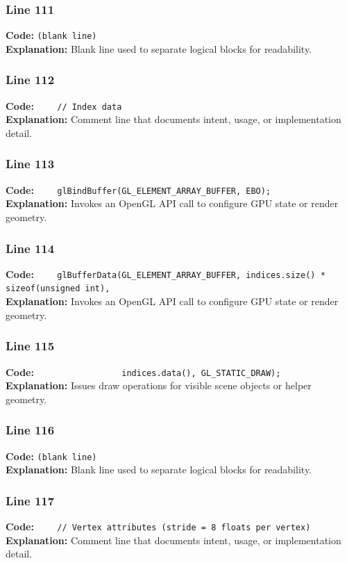 \documentclass[11pt,a4paper]{article}
\begin{document}
\subsubsection*{Line 111}
\textbf{Code:} \texttt{(blank line)}\\
\textbf{Explanation:} Blank line used to separate logical blocks for readability.

\subsubsection*{Line 112}
\textbf{Code:} \verb|    // Index data|\\
\textbf{Explanation:} Comment line that documents intent, usage, or implementation detail.

\subsubsection*{Line 113}
\textbf{Code:} \verb|    glBindBuffer(GL_ELEMENT_ARRAY_BUFFER, EBO);|\\
\textbf{Explanation:} Invokes an OpenGL API call to configure GPU state or render geometry.

\subsubsection*{Line 114}
\textbf{Code:} \verb|    glBufferData(GL_ELEMENT_ARRAY_BUFFER, indices.size() * sizeof(unsigned int),|\\
\textbf{Explanation:} Invokes an OpenGL API call to configure GPU state or render geometry.

\subsubsection*{Line 115}
\textbf{Code:} \verb|                 indices.data(), GL_STATIC_DRAW);|\\
\textbf{Explanation:} Issues draw operations for visible scene objects or helper geometry.

\subsubsection*{Line 116}
\textbf{Code:} \texttt{(blank line)}\\
\textbf{Explanation:} Blank line used to separate logical blocks for readability.

\subsubsection*{Line 117}
\textbf{Code:} \verb|    // Vertex attributes (stride = 8 floats per vertex)|\\
\textbf{Explanation:} Comment line that documents intent, usage, or implementation detail.
\end{document}
